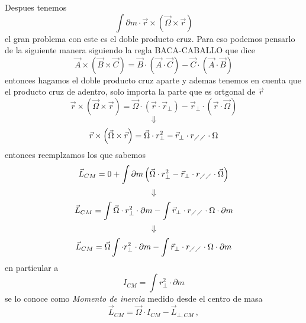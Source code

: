 \documentclass[../Main.tex]{subfiles}
\begin{document}
\npage{
}
{

    Despues tenemos
    \begin{equation*}
        \int \partial m \cdot \vec{r} \times \left( \vec{\Omega} \times \vec{r} \right)
    \end{equation*}
    el gran problema con este es el doble producto cruz. Para eso podemos pensarlo
    de la siguiente manera siguiendo la regla BACA-CABALLO que dice
    \begin{equation*}
        \vec{A} \times \left( \vec{B} \times \vec{C} \right ) = \vec{B} \cdot \left( \vec{A} \cdot \vec{C} \right) - \vec{C} \cdot \left( \vec{A} \cdot \vec{B} \right) 
    \end{equation*}
    entonces hagamos el doble producto cruz aparte y ademas tenemos en cuenta que
    el producto cruz de adentro, solo importa la parte que es ortgonal de $\vec{r}$
    \begin{equation*}
        \vec{r} \times \left( \vec{\Omega} \times \vec{r} \right) = \vec{\Omega} \cdot \left( \vec{r} \cdot \vec{r}_{\bot} \right) - \vec{r}_{\bot} \cdot \left( \vec{r} \cdot \vec{\Omega} \right)
    \end{equation*}
    \begin{equation*}
        \Downarrow
    \end{equation*}
    \begin{equation*}
        \vec{r} \times \left( \vec{\Omega} \times \vec{r} \right) = \vec{\Omega} \cdot r_{\bot}^2 - \vec{r}_{\bot} \cdot r_{\diagup \diagup} \cdot \Omega
    \end{equation*}
    entonces reemplzamos los que sabemos
    \begin{equation*}
        \vec{L}_{CM} = 0 + \int \partial m \left( \vec{\Omega} \cdot r_{\bot}^2 - \vec{r}_{\bot} \cdot r_{\diagup \diagup} \cdot \vec{\Omega} \right)
    \end{equation*}
    \begin{equation*}
        \Downarrow
    \end{equation*}
    \begin{equation*}
        \vec{L}_{CM} = \int \vec{\Omega} \cdot r_{\bot}^2 \cdot \partial m  - \int \vec{r}_{\bot} \cdot r_{\diagup \diagup} \cdot \Omega \cdot \partial m
    \end{equation*}
    \begin{equation*}
        \Downarrow
    \end{equation*}
    \begin{equation*}
        \vec{L}_{CM} = \vec{\Omega} \int \cdot r_{\bot}^2 \cdot \partial m  - \int \vec{r}_{\bot} \cdot r_{\diagup \diagup} \cdot \Omega \cdot \partial m
    \end{equation*}
    en particular a 
    \begin{equation*}
        I_{CM} = \int r_{\bot}^2 \cdot \partial m
    \end{equation*}
    se lo conoce como \textit{Momento de inercia} medido desde el centro de masa
    \begin{equation*}
        \vec{L}_{CM} = \vec{\Omega} \cdot I_{CM} - \vec{L}_{\bot, CM} \ ,
    \end{equation*}

}
\end{document}
